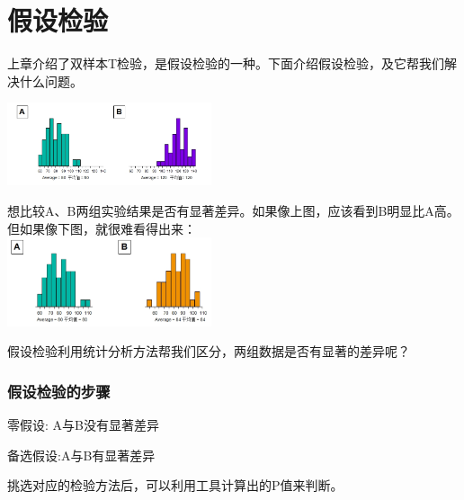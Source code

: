 \chapter{假设检验} %

上章介绍了双样本T检验，是假设检验的一种。下面介绍假设检验，及它帮我们解决什么问题。


\includegraphics[width=6cm]{CompareAB1Screenshot_2022-11-06_2119471.jpg}

想比较A、B两组实验结果是否有显著差异。如果像上图，应该看到B明显比A高。\\
但如果像下图，就很难看得出来：\\

\includegraphics[width=6cm]{CompareAB2Screenshot_2022-11-06_2120361.jpg}

假设检验利用统计分析方法帮我们区分，两组数据是否有显著的差异呢？

\hypertarget{ux5047ux8bbeux68c0ux9a8cux7684ux6b65ux9aa4}{%
\subsection{假设检验的步骤}\label{ux5047ux8bbeux68c0ux9a8cux7684ux6b65ux9aa4}}

零假设: A与B没有显著差异

备选假设:A与B有显著差异

挑选对应的检验方法后，可以利用工具计算出的P值来判断。

\begin{description}
\item[]
\end{description}

